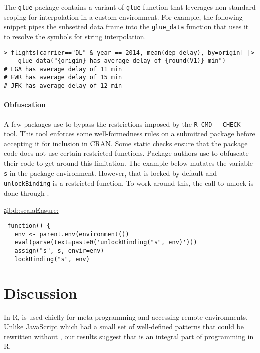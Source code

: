 \documentclass[review,screen,acmsmall]{acmart}%
\renewcommand{\k}[1]{\lstinline |#1|\xspace}
\begin{document}
The \k{glue} package contains a variant of \k{glue} function that leverages
non-standard scoping for interpolation in a custom environment. For example, the
following snippet pipes the subsetted data frame into the \k{glue_data} function
that uses it to resolve the symbols for string interpolation.

\begin{minipage}{.95\textwidth}
\medskip
\begin{lstlisting}
> flights[carrier=="DL" & year == 2014, mean(dep_delay), by=origin] |> 
    glue_data("{origin} has average delay of {round(V1)} min")
# LGA has average delay of 11 min
# EWR has average delay of 15 min
# JFK has average delay of 12 min
\end{lstlisting}\medskip
\end{minipage}


\paragraph{Obfuscation}
A few packages use \eval to bypass the restrictions imposed by the \k{R CMD
  CHECK} tool. This tool enforces some well-formedness rules on a submitted
package before accepting it for inclusion in CRAN. Some static checks ensure
that the package code does not use certain restricted functions. Package authors
use \eval to obfuscate their code to get around this limitation. The example
below mutates the variable \k{s} in the package environment. However, that is
locked by default and \k{unlockBinding} is a restricted function. To work around
this, the call to unlock is done through \eval.

\begin{minipage}{.95\textwidth}
  \medskip\underline{\c{aibd::scalaEnsure}:}
\begin{lstlisting}
 function() {
   env <- parent.env(environment())
   eval(parse(text=paste0('unlockBinding("s", env)')))
   assign("s", s, envir=env)
   lockBinding("s", env)
\end{lstlisting}\medskip
\end{minipage}

\section{Discussion}


In R, \eval is used chiefly for meta-programming and accessing remote
environments. Unlike JavaScript which had a small set of well-defined patterns
that could be rewritten without \eval, our results suggest that \eval is an
integral part of programming in R.
\end{document}
